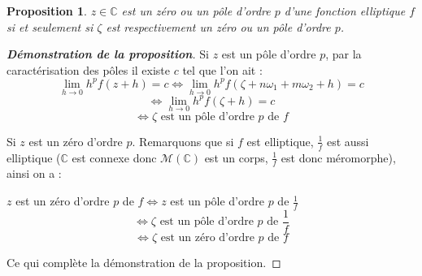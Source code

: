 \documentclass[12pt]{article}
\newtheorem{proposition}{Proposition}
\begin{document}
\begin{proposition}
    $z \in \mathbb{C}$ est un zéro ou un pôle d’ordre $p$ d’une fonction elliptique $f$ si et seulement si $\zeta$ est respectivement un zéro ou un pôle d’ordre $p$.

\end{proposition}

\begin{proof}[\textbf{Démonstration de la proposition}]

Si $z$ est un pôle d'ordre $p$, par la caractérisation des pôles il existe $c$ tel que l'on ait :
\[
\lim_{h \to 0} h^p f(z + h) = c \iff \lim_{h \to 0} h^p f(\zeta + n\omega_1 + m\omega_2 + h) = c
\]
\[
\iff \lim_{h \to 0} h^p f(\zeta + h) = c
\]
\[
\iff \zeta \text{ est un pôle d'ordre } p \text{ de } f
\]

Si $z$ est un zéro d'ordre $p$. Remarquons que si $f$ est elliptique, $\frac{1}{f}$ est aussi elliptique ($\mathbb{C}$ est connexe donc $\mathcal{M}(\mathbb{C})$ est un corps, $\frac{1}{f}$ est donc méromorphe), ainsi on a :

$z$ est un zéro d'ordre $p$ de $f \iff z $ est un pôle d'ordre $p$ de $\frac{1}{f}$ 
\[
\iff \zeta \text{ est un pôle d'ordre } p \text{ de } \frac{1}{f}
\]
\[
\iff \zeta \text{ est un zéro d'ordre } p \text{ de } f
\]

Ce qui complète la démonstration de la proposition.
\end{proof}
\end{document}
